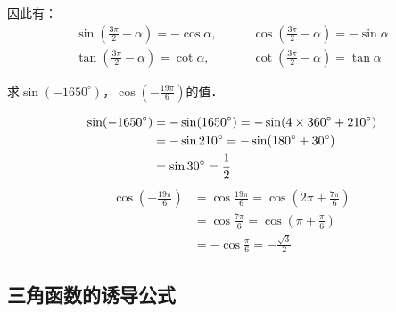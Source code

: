 因此有：
\begin{equation}
    \begin{split}
        \sin\left(\frac{3\pi}{2}-\alpha\right)=-\cos\alpha, &\qquad \cos\left(\frac{3\pi}{2}-\alpha\right)=-\sin\alpha \\
        \tan\left(\frac{3\pi}{2}-\alpha\right)=\cot\alpha, &\qquad \cot\left(\frac{3\pi}{2}-\alpha\right)=\tan\alpha 
    \end{split}    
    \end{equation}

\begin{example}
求$\sin(-1650^{\circ})$，$\cos\left(-\frac{19\pi}{6}\right)$的值．
\end{example}

\begin{solution}
\[\begin{split}
    \sin(-1650^{\circ})&=-\sin(1650^{\circ})=-\sin(4\times360^{\circ}+210^{\circ})\\
    &=-\sin 210^{\circ}=-\sin(180^{\circ}+30^{\circ})\\
    &=\sin30^{\circ}=\dfrac{1}{2}
\end{split}\]
\[\begin{split}
    \cos\left(-\frac{19\pi}{6}\right)&=\cos\frac{19\pi}{6}=\cos\left(2\pi+\frac{7\pi}{6}\right)\\
    &=\cos\frac{7\pi}{6}=\cos\left(\pi+\frac{\pi}{6}\right)\\
    &=-\cos\frac{\pi}{6}=-\frac{\sqrt{3}}{2}
\end{split}\]
\end{solution}

\subsection{三角函数的诱导公式}

